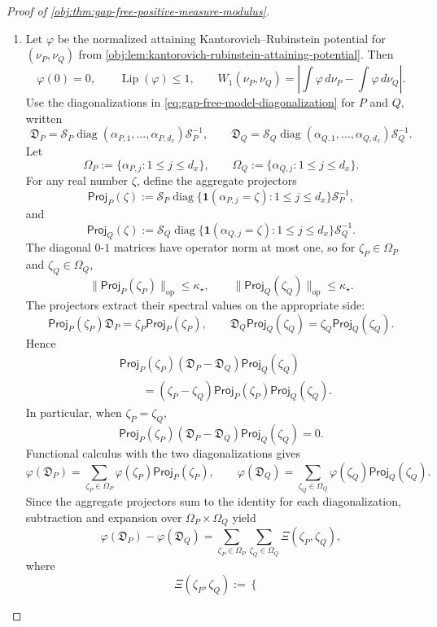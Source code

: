 \begin{proof}[Proof of \cref{obj:thm:gap-free-positive-measure-modulus}]
\begin{enumerate}
\item Let \(\varphi\) be the normalized attaining Kantorovich--Rubinstein potential for
\((\nu_P,\nu_Q)\) from \cref{obj:lem:kantorovich-rubinstein-attaining-potential}.  Then
\[
\varphi(0)=0,
\qquad
\operatorname{Lip}(\varphi)\le1,
\qquad
W_1(\nu_P,\nu_Q)
=
\left|
\int\varphi\,d\nu_P-\int\varphi\,d\nu_Q
\right|.
\]
Use the diagonalizations in \cref{eq:gap-free-model-diagonalization} for \(P\) and \(Q\), written
\[
\mathfrak D_P
=
\mathcal S_P\operatorname{diag}(\alpha_{P,1},\ldots,\alpha_{P,d_x})\mathcal S_P^{-1},
\qquad
\mathfrak D_Q
=
\mathcal S_Q\operatorname{diag}(\alpha_{Q,1},\ldots,\alpha_{Q,d_x})\mathcal S_Q^{-1}.
\]
Let
\[
\Omega_P:=\{\alpha_{P,j}:1\le j\le d_x\},
\qquad
\Omega_Q:=\{\alpha_{Q,j}:1\le j\le d_x\}.
\]
For any real number \(\zeta\), define the aggregate projectors
\[
\mathsf{Proj}_P(\zeta)
:=
\mathcal S_P\operatorname{diag}\{\mathbf 1(\alpha_{P,j}=\zeta):1\le j\le d_x\}\mathcal S_P^{-1},
\]
and
\[
\mathsf{Proj}_Q(\zeta)
:=
\mathcal S_Q\operatorname{diag}\{\mathbf 1(\alpha_{Q,j}=\zeta):1\le j\le d_x\}\mathcal S_Q^{-1}.
\]
The diagonal \(0\)-\(1\) matrices have operator norm at most one, so for
\(\zeta_P\in\Omega_P\) and \(\zeta_Q\in\Omega_Q\),
\[
\|\mathsf{Proj}_P(\zeta_P)\|_{\mathrm{op}}\le\kappa_\star,
\qquad
\|\mathsf{Proj}_Q(\zeta_Q)\|_{\mathrm{op}}\le\kappa_\star.
\]
The projectors extract their spectral values on the appropriate side:
\[
\mathsf{Proj}_P(\zeta_P)\mathfrak D_P
=
\zeta_P\mathsf{Proj}_P(\zeta_P),
\qquad
\mathfrak D_Q\mathsf{Proj}_Q(\zeta_Q)
=
\zeta_Q\mathsf{Proj}_Q(\zeta_Q).
\]
Hence
\[
\begin{aligned}
&\mathsf{Proj}_P(\zeta_P)(\mathfrak D_P-\mathfrak D_Q)\mathsf{Proj}_Q(\zeta_Q)\\
&\qquad=
(\zeta_P-\zeta_Q)\mathsf{Proj}_P(\zeta_P)\mathsf{Proj}_Q(\zeta_Q).
\end{aligned}
\]
In particular, when \(\zeta_P=\zeta_Q\),
\[
\mathsf{Proj}_P(\zeta_P)(\mathfrak D_P-\mathfrak D_Q)\mathsf{Proj}_Q(\zeta_Q)=0.
\]
Functional calculus with the two diagonalizations gives
\[
\varphi(\mathfrak D_P)
=
\sum_{\zeta_P\in\Omega_P}\varphi(\zeta_P)\mathsf{Proj}_P(\zeta_P),
\qquad
\varphi(\mathfrak D_Q)
=
\sum_{\zeta_Q\in\Omega_Q}\varphi(\zeta_Q)\mathsf{Proj}_Q(\zeta_Q).
\]
Since the aggregate projectors sum to the identity for each diagonalization, subtraction and expansion over
\(\Omega_P\times\Omega_Q\) yield
\[
\varphi(\mathfrak D_P)-\varphi(\mathfrak D_Q)
=
\sum_{\zeta_P\in\Omega_P}\sum_{\zeta_Q\in\Omega_Q}
\Xi(\zeta_P,\zeta_Q),
\]
where
\[
\Xi(\zeta_P,\zeta_Q)
:=
\begin{cases}

\end{cases}\]
\end{enumerate}
\end{proof}
